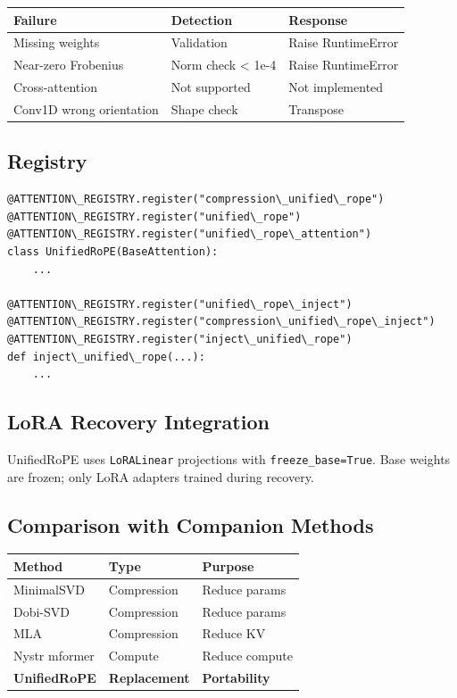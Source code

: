 \begin{table}[H]
\centering
\small
\begin{tabular}{lll}
\toprule
\textbf{Failure} & \textbf{Detection} & \textbf{Response} \\
\midrule
Missing weights & Validation & Raise RuntimeError \\
Near-zero Frobenius & Norm check \textless{} 1e-4 & Raise RuntimeError \\
Cross-attention & Not supported & Not implemented \\
Conv1D wrong orientation & Shape check & Transpose \\
\bottomrule
\end{tabular}
\end{table}

\subsection{Registry}

\begin{lstlisting}
@ATTENTION\_REGISTRY.register("compression\_unified\_rope")
@ATTENTION\_REGISTRY.register("unified\_rope")
@ATTENTION\_REGISTRY.register("unified\_rope\_attention")
class UnifiedRoPE(BaseAttention):
    ...

@ATTENTION\_REGISTRY.register("unified\_rope\_inject")
@ATTENTION\_REGISTRY.register("compression\_unified\_rope\_inject")
@ATTENTION\_REGISTRY.register("inject\_unified\_rope")
def inject\_unified\_rope(...):
    ...
\end{lstlisting}

\subsection{LoRA Recovery Integration}

UnifiedRoPE uses \texttt{LoRALinear} projections with \texttt{freeze\_base=True}. Base 
weights are frozen; only LoRA adapters trained during recovery.

\subsection{Comparison with Companion Methods}

\begin{table}[H]
\centering
\small
\begin{tabular}{lll}
\toprule
\textbf{Method} & \textbf{Type} & \textbf{Purpose} \\
\midrule
MinimalSVD & Compression & Reduce params \\
Dobi-SVD & Compression & Reduce params \\
MLA & Compression & Reduce KV \\
Nystr mformer & Compute & Reduce compute \\
\textbf{UnifiedRoPE} & \textbf{Replacement} & \textbf{Portability} \\
\bottomrule
\end{tabular}
\end{table}

